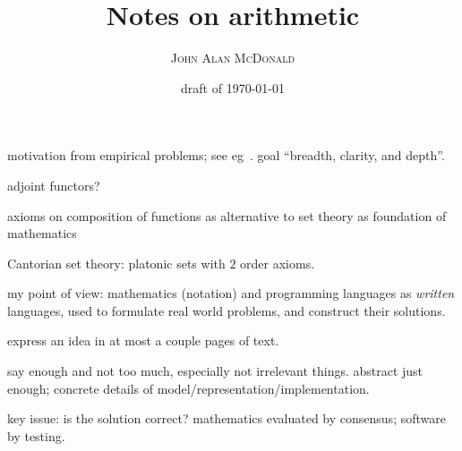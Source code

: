 \documentclass[10pt,openany]{book}
\title{Notes on arithmetic}
\author{\textsc{John Alan McDonald}}
\date{draft of \today}
\begin{document}
\maketitle


% 

\setcounter{baseSectionLevel}{6}

motivation from empirical problems; 
see eg~\cite{maclane1981mathModels}.
goal ``breadth, clarity, and depth''.

adjoint functors?

axioms on composition of functions as alternative to set theory
as foundation of mathematics

Cantorian set theory: platonic sets with $2$ order axioms.

my point of view: 
mathematics (notation) and programming languages
as \textit{written} languages,
used to formulate real world problems,
and construct their solutions.

express an idea in at most a couple pages of text.

say enough and not too much, especially not irrelevant things.
abstract just enough; 
concrete details of model/representation/implementation.

key issue: is the solution correct?
mathematics evaluated by consensus;
software by testing.


%

\setcounter{currentlevel}{\value{baseSectionLevel}}

\setcounter{currentlevel}{\value{baseSectionLevel}}

\setcounter{currentlevel}{\value{baseSectionLevel}}

\setcounter{currentlevel}{\value{baseSectionLevel}}

\setcounter{currentlevel}{\value{baseSectionLevel}}

\setcounter{currentlevel}{\value{baseSectionLevel}}


%
\backmatter


%
\printbibliography[heading=bibintoc, title={References}]
\end{document}
